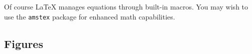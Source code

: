 \documentclass{ifacconf}
\begin{document}



Of course LaTeX manages equations through built-in macros. You may
wish to use the \texttt{amstex} package for enhanced math
capabilities.

\subsection{Figures}


\end{document}
